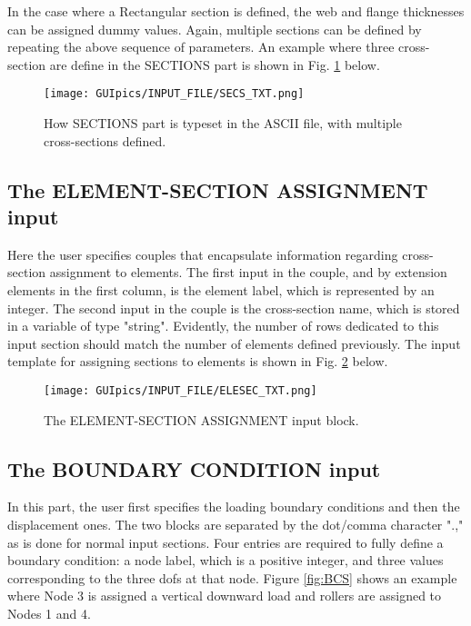 In the case where a Rectangular section is defined, the web and flange 
thicknesses can be assigned dummy values. Again, multiple sections can be 
defined by repeating the above sequence of parameters. An example where three 
cross-section are define in the SECTIONS part is shown in Fig. \ref{fig:SECS} 
below.

\begin{figure}[t]
	\centering
	\texttt{[image: GUIpics/INPUT\_FILE/SECS\_TXT.png]}
	\caption{How SECTIONS part is typeset in the ASCII file, with multiple 
		cross-sections defined.}
	\label{fig:SECS}
\end{figure}


\subsection{The ELEMENT-SECTION ASSIGNMENT input}

Here the user specifies couples that encapsulate information regarding 
cross-section assignment to elements. The first input in the couple, and by 
extension elements in the first column, is the element label, which is 
represented by an integer. The second input in the couple is the cross-section 
name, which is stored in a variable of type "string". Evidently, the number of 
rows dedicated to this input section should match the number of elements 
defined previously. The input template for assigning sections to elements is 
shown in Fig. \ref{fig:ELESECS} below.

\begin{figure}[t]
	\centering
	\texttt{[image: GUIpics/INPUT\_FILE/ELESEC\_TXT.png]}
	\caption{The ELEMENT-SECTION ASSIGNMENT input block.}
	\label{fig:ELESECS}
\end{figure}

\subsection{The BOUNDARY CONDITION input}

In this part, the user first specifies the loading boundary conditions and then 
the displacement ones. The two blocks are separated by the dot/comma character 
".," as is done for normal input sections. Four entries are required to fully 
define a boundary condition: a node label, which is a positive integer, and 
three values corresponding to the three \acrshort{dof}s at that node. Figure 
\ref{fig:BCS} shows an example where Node 3 is assigned a vertical downward 
load and rollers are assigned to Nodes 1 and 4.

